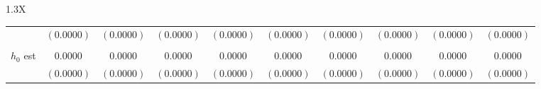 \documentclass[10pt]{article}
\begin{document}
{\begin{tabularx}{1.3\textwidth}{X}
{\begin{tabular}{cccccccccc}
 & $(0.0000)$ & $(0.0000)$ & $(0.0000)$ & $(0.0000)$ & $(0.0000)$ & $(0.0000)$ & $(0.0000)$& $(0.0000)$& $(0.0000)$ \\
\cmidrule(r){1-10} \\
 { $h_0$ est}& $0.0000$ & $0.0000$ & $0.0000$ & $0.0000$ & $0.0000$ & $0.0000$ & $0.0000$& $0.0000$& $0.0000$ \\
 & $(0.0000)$ & $(0.0000)$ & $(0.0000)$ & $(0.0000)$ & $(0.0000)$ & $(0.0000)$ & $(0.0000)$& $(0.0000)$& $(0.0000)$ \\
\bottomrule
\end{tabular}}
\end{tabularx}}

  \vspace{3 cm}

  
\end{document}
